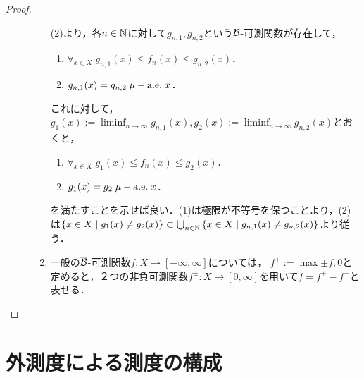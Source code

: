 \documentclass[uplatex, dvipdfmx]{jsreport}
\begin{document}
\begin{proof}
\begin{description}
\begin{enumerate}
            (2)より，各$n\in\mathbb{N}$に対して$g_{n,1},g_{n,2}$という$\mathcal{B}$-可測関数が存在して，
            \begin{enumerate}
                \item $\forall_{x\in X}\;g_{n,1}(x)\le f_n(x)\le g_{n,2}(x)$．
                \item $g_{n,1}(x)=g_{n,2}\;\mu-\mathrm{a.e.}\; x$．
            \end{enumerate}
            これに対して，$g_1(x):=\liminf_{n\to\infty}g_{n,1}(x),g_2(x):=\liminf_{n\to\infty}g_{n,2}(x)$とおくと，
            \begin{enumerate}
                \item $\forall_{x\in X}\;g_{1}(x)\le f_n(x)\le g_{2}(x)$．
                \item $g_{1}(x)=g_{2}\;\mu-\mathrm{a.e.}\; x$．
            \end{enumerate}
            を満たすことを示せば良い．(1)は極限が不等号を保つことより，(2)は$\{x\in X\mid g_1(x)\ne g_2(x)\}\subset\bigcup_{n\in\mathbb{N}}\left\{x\in X\mid g_{n,1}(x)\ne g_{n,2}(x)\right\}$より従う．
            \item 一般の$\overline{\mathcal{B}}$-可測関数$f:X\to[-\infty,\infty]$については，
            $f^{\pm}:=\max{\pm f,0}$と定めると，２つの非負可測関数$f^\pm:X\to[0,\infty]$を用いて$f=f^+-f^-$と表せる．
        \end{enumerate}
    \end{description}
\end{proof}


\section{外測度による測度の構成}

    
\end{document}
